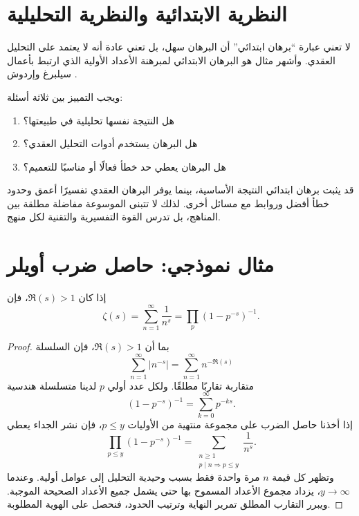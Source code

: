 \section{النظرية الابتدائية والنظرية التحليلية}

لا تعني عبارة ``برهان ابتدائي'' أن البرهان سهل، بل تعني عادة أنه لا يعتمد على التحليل العقدي. وأشهر مثال هو البرهان الابتدائي لمبرهنة الأعداد الأولية الذي ارتبط
بأعمال سيلبرغ وإردوش \cite{BaasSkau2008,Newman1980}.

ويجب التمييز بين ثلاثة أسئلة:

\begin{enumerate}
  \item هل النتيجة نفسها تحليلية في طبيعتها؟
  \item هل البرهان يستخدم أدوات التحليل العقدي؟
  \item هل البرهان يعطي حد خطأ فعالًا أو مناسبًا للتعميم؟
\end{enumerate}

قد يثبت برهان ابتدائي النتيجة الأساسية، بينما يوفر البرهان العقدي تفسيرًا أعمق وحدود خطأ أفضل وروابط مع مسائل أخرى. لذلك لا تتبنى الموسوعة مفاضلة مطلقة بين المناهج، بل تدرس القوة التفسيرية والتقنية لكل منهج.

\section{مثال نموذجي: حاصل ضرب أويلر}

\begin{theorem}
\provedhere
\label{thm:euler-product-intro}
إذا كان \(\Re(s)>1\)، فإن
\[
\zeta(s)=\sum_{n=1}^{\infty}\frac{1}{n^s}
=\prod_{p}\left(1-p^{-s}\right)^{-1}.
\]
\end{theorem}

\begin{proof}
بما أن \(\Re(s)>1\)، فإن السلسلة
\[
\sum_{n=1}^{\infty}|n^{-s}|=\sum_{n=1}^{\infty}n^{-\Re(s)}
\]
متقاربة تقاربًا مطلقًا. ولكل عدد أولي \(p\) لدينا متسلسلة هندسية
\[
\left(1-p^{-s}\right)^{-1}
=\sum_{k=0}^{\infty}p^{-ks}.
\]
إذا أخذنا حاصل الضرب على مجموعة منتهية من الأوليات \(p\leq y\)، فإن نشر الجداء يعطي
\[
\prod_{p\leq y}\left(1-p^{-s}\right)^{-1}
=
\sum_{\substack{n\geq 1\\ p\mid n\Rightarrow p\leq y}}\frac{1}{n^s}.
\]
وتظهر كل قيمة \(n\) مرة واحدة فقط بسبب وحيدية التحليل إلى عوامل أولية. وعندما \(y\to\infty\)، يزداد مجموع الأعداد المسموح بها حتى يشمل جميع الأعداد الصحيحة الموجبة. ويبرر التقارب المطلق تمرير النهاية وترتيب الحدود، فنحصل على الهوية المطلوبة.
\end{proof}

